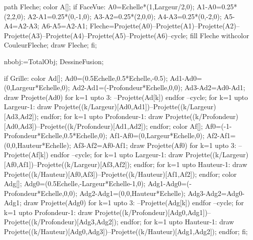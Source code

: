{\begin{mplibcode}[\PfCVueCubeNom]
    path Fleche;
    color A[];
    if FaceVue:
    A0=Echelle*(1,Largeur/2,0);
    A1-A0=0.25*(2,2,0);
    A2-A1=0.25*(0,-1,0);
    A3-A2=0.25*(2,0,0);
    A4-A3=0.25*(0,-2,0);
    A5-A4=A2-A3;
    A6-A5=A2-A1;
    Fleche=Projette(A0)--Projette(A1)--Projette(A2)--Projette(A3)--Projette(A4)--Projette(A5)--Projette(A6)--cycle;
    fill Fleche withcolor CouleurFleche;
    draw Fleche;
    fi;    
    
    nbobj:=TotalObj;
    DessineFusion;

    if Grille:
    color Ad[];
    Ad0=(0.5Echelle,0.5*Echelle,-0.5);
    Ad1-Ad0=(0,Largeur*Echelle,0);
    Ad2-Ad1=(-Profondeur*Echelle,0,0);
    Ad3-Ad2=Ad0-Ad1;
    draw Projette(Ad0) for k=1 upto 3: --Projette(Ad[k]) endfor --cycle;
    for k=1 upto Largeur-1:
    draw Projette((k/Largeur)[Ad0,Ad1])--Projette((k/Largeur)[Ad3,Ad2]);
    endfor;
    for k=1 upto Profondeur-1:
    draw Projette((k/Profondeur)[Ad0,Ad3])--Projette((k/Profondeur)[Ad1,Ad2]);
    endfor;
    color Af[];
    Af0=(-1-Profondeur*Echelle,0.5*Echelle,0);
    Af1-Af0=(0,Largeur*Echelle,0);
    Af2-Af1=(0,0,Hauteur*Echelle);
    Af3-Af2=Af0-Af1;
    draw Projette(Af0) for k=1 upto 3: --Projette(Af[k]) endfor --cycle;
    for k=1 upto Largeur-1:
    draw Projette((k/Largeur)[Af0,Af1])--Projette((k/Largeur)[Af3,Af2]);
    endfor;
    for k=1 upto Hauteur-1:
    draw Projette((k/Hauteur)[Af0,Af3])--Projette((k/Hauteur)[Af1,Af2]);
    endfor;
    color Adg[];
    Adg0=(0.5Echelle,-Largeur*Echelle-1,0);
    Adg1-Adg0=(-Profondeur*Echelle,0,0);
    Adg2-Adg1=(0,0,Hauteur*Echelle);
    Adg3-Adg2=Adg0-Adg1;
    draw Projette(Adg0) for k=1 upto 3: --Projette(Adg[k]) endfor --cycle;
    for k=1 upto Profondeur-1:
    draw Projette((k/Profondeur)[Adg0,Adg1])--Projette((k/Profondeur)[Adg3,Adg2]);
    endfor;
    for k=1 upto Hauteur-1:
    draw Projette((k/Hauteur)[Adg0,Adg3])--Projette((k/Hauteur)[Adg1,Adg2]);
    endfor;
    fi;
  \end{mplibcode}
  }
